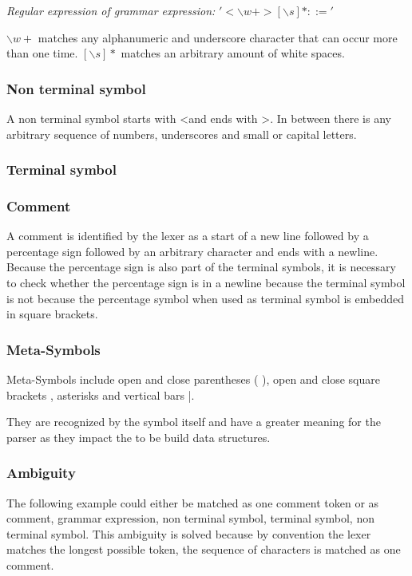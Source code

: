 \textit{Regular expression of grammar expression:}  $'<\backslash w+>[\backslash s]*::='$

$\backslash w+$ matches any alphanumeric and underscore character that can occur more than one time.
$[\backslash s]*$ matches an arbitrary amount of white spaces.

\subsubsection{Non terminal symbol}

A non terminal symbol starts with \dq <\dq and ends with \dq >\dq. In between there is any arbitrary sequence of numbers, underscores and small or capital letters.

\subsubsection{Terminal symbol}

\subsubsection{Comment}

A comment is identified by the lexer as a start of a new line followed by a percentage sign followed by an arbitrary character and ends with a newline. Because the percentage sign is also part of the terminal symbols, it is necessary to check whether the percentage sign is in a newline because the terminal symbol is not because the percentage symbol when used as terminal symbol is embedded in square brackets.    

\subsubsection{Meta-Symbols}

Meta-Symbols include open and close parentheses \dq( )\dq, open and close square brackets \dq[ ]\dq, asterisks \dq *\dq and vertical bars \dq |\dq.

They are recognized by the symbol itself and have a greater meaning for the parser as they impact the to be build data structures. 

\subsubsection{Ambiguity}

The following example could either be matched as one comment token or as comment, grammar expression, non terminal symbol, terminal symbol, non terminal symbol.
This ambiguity is solved because by convention the lexer matches the longest possible token, the sequence of characters is matched as one comment.
\begin{lstlisting}[basicstyle=\scriptsize	,caption= Example of a commented out production rule,label= lst:Lexer_example]
%----   <formula_role> ::= <user_role>-<source>
\end{lstlisting}
